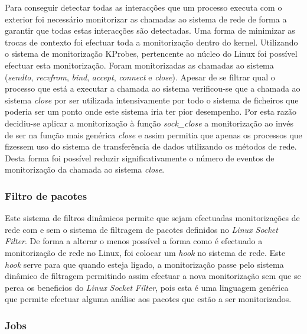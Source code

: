 \documentclass[runningheads,a4paper]{llncs}
\begin{document}
Para conseguir detectar todas as interacções que um processo executa com o exterior foi necessário monitorizar as chamadas ao sistema de rede de forma a garantir que todas estas interacções são detectadas. Uma forma de minimizar as trocas de contexto foi efectuar toda a monitorização dentro do kernel. Utilizando o sistema de monitorização KProbes, pertencente ao núcleo do Linux foi possível efectuar esta monitorização. Foram monitorizadas as chamadas ao sistema (\textit{sendto}, \textit{recvfrom}, \textit{bind}, \textit{accept}, \textit{connect} e  \textit{close}).
Apesar de se filtrar qual o processo que está a executar a chamada ao sistema verificou-se que a chamada ao sistema \textit{close} por ser utilizada intensivamente por todo o sistema de ficheiros que poderia ser um ponto onde este sistema iria ter pior desempenho. Por esta razão decidiu-se aplicar a monitorização à função \textit{sock\_close} a monitorização ao invés de ser na função mais genérica \textit{close} e assim permitia que apenas os processos que fizessem uso do sistema de transferência de dados utilizando os métodos de rede. Desta forma foi possível reduzir significativamente o número de eventos de monitorização da chamada ao sistema \textit{close}.

\subsubsection*{Filtro de pacotes}
\label{subsub:packet_filter}

Este sistema de filtros dinâmicos permite que sejam efectuadas monitorizações de rede com e sem o sistema de filtragem de pacotes definidos no \textit{Linux Socket Filter}. De forma a alterar o menos possível a forma como é efectuado a monitorização de rede no Linux, foi colocar um \textit{hook} no sistema de rede. Este \textit{hook} serve para que quando esteja ligado, a monitorização passe pelo sistema dinâmico de filtragem permitindo assim efectuar a nova monitorização sem que se perca os beneficios do \textit{Linux Socket Filter}, pois esta é uma linguagem genérica que permite efectuar alguma análise aos pacotes que estão a ser monitorizados.


\subsubsection{Jobs}
\label{subsub:jobs}
\end{document}
